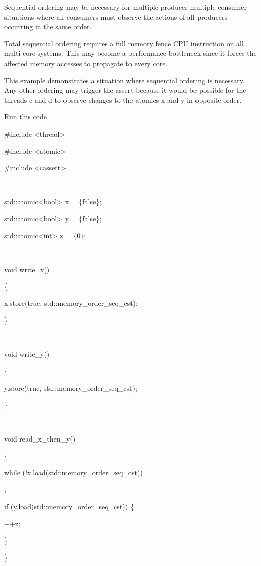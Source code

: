 \documentclass[
]{article}
\begin{document}
Sequential ordering may be necessary for multiple producer-multiple
consumer situations where all consumers must observe the actions of all
producers occurring in the same order.

Total sequential ordering requires a full memory fence CPU instruction
on all multi-core systems. This may become a performance bottleneck
since it forces the affected memory accesses to propagate to every core.

This example demonstrates a situation where sequential ordering is
necessary. Any other ordering may trigger the assert because it would be
possible for the threads c and d to observe changes to the atomics x and
y in opposite order.

Run this code

\#include \textless thread\textgreater{}

\#include \textless atomic\textgreater{}

\#include \textless cassert\textgreater{}

~

\href{http://en.cppreference.com/w/cpp/atomic/atomic}{std::atomic}\textless bool\textgreater{}
x = \{false\};

\href{http://en.cppreference.com/w/cpp/atomic/atomic}{std::atomic}\textless bool\textgreater{}
y = \{false\};

\href{http://en.cppreference.com/w/cpp/atomic/atomic}{std::atomic}\textless int\textgreater{}
z = \{0\};

~

void write\_x()

\{

x.store(true, std::memory\_order\_seq\_cst);

\}

~

void write\_y()

\{

y.store(true, std::memory\_order\_seq\_cst);

\}

~

void read\_x\_then\_y()

\{

while (!x.load(std::memory\_order\_seq\_cst))

;

if (y.load(std::memory\_order\_seq\_cst)) \{

++z;

\}

\}

~
\end{document}
